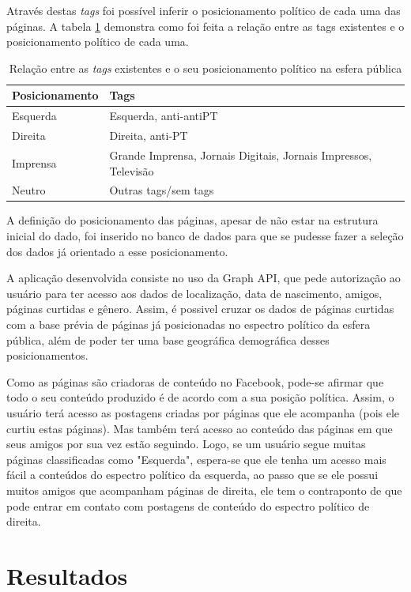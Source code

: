 \documentclass[
	12pt,				%
	oneside,			%
	a4paper,			%
	english,			%
	brazil				%
	]{abntex2ppgsi}
\begin{document}
Através destas \textit{tags} foi possível inferir o posicionamento político de cada uma das páginas. A tabela \ref{tab:tabelaTags} demonstra como foi feita a relação entre as tags existentes e o posicionamento político de cada uma.  

\begin{table}[htbp]
	\label{tab:tabelaTags}
	\centering
	\caption{Relação entre as \textit{tags} existentes e o seu posicionamento político na esfera pública}
		\begin{tabular}{p{2in} p{2in} } \hline
			Posicionamento 	& Tags \\ \hline
			Esquerda		& Esquerda, anti-antiPT \\
			Direita			& Direita, anti-PT \\
			Imprensa		& Grande Imprensa, Jornais Digitais, Jornais Impressos, Televisão \\
			Neutro			& Outras tags/sem tags \\ \hline
		\end{tabular}
\end{table}

A definição do posicionamento das páginas, apesar de não estar na estrutura inicial do dado, foi inserido no banco de dados para que se pudesse fazer a seleção dos dados já orientado a esse posicionamento. 

A aplicação desenvolvida consiste no uso da Graph API, que pede autorização ao usuário para ter acesso aos dados de localização, data de nascimento, amigos, páginas curtidas e gênero. Assim, é possivel cruzar os dados de páginas curtidas com a base prévia de páginas já posicionadas no espectro político da esfera pública, além de poder ter uma base geográfica demográfica desses posicionamentos.

Como as páginas são criadoras de conteúdo no Facebook, pode-se afirmar que todo o seu conteúdo produzido é de acordo com a sua posição política. Assim, o usuário terá acesso as postagens criadas por páginas que ele acompanha (pois ele curtiu estas páginas). Mas também terá acesso ao conteúdo das páginas em que seus amigos por sua vez estão seguindo. Logo, se um usuário segue muitas páginas classificadas como "Esquerda", espera-se que ele tenha um acesso mais fácil a conteúdos do espectro político da esquerda, ao passo que se ele possui muitos amigos que acompanham páginas de direita, ele tem o contraponto de que pode entrar em contato com postagens de conteúdo do espectro político de direita.

\chapter{Resultados}
\end{document}
